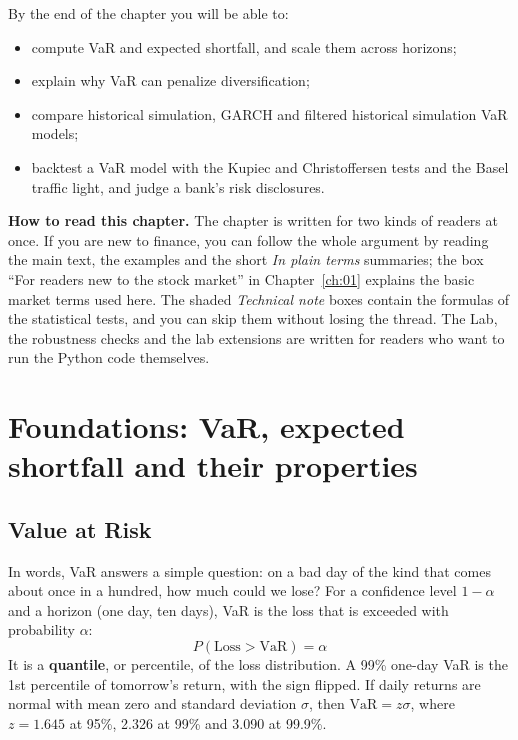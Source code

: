 By the end of the chapter you will be able to:

\begin{itemize}[nosep]
  \item compute VaR and expected shortfall, and scale them across horizons;
  \item explain why VaR can penalize diversification;
  \item compare historical simulation, GARCH and filtered historical simulation VaR models;
  \item backtest a VaR model with the Kupiec and Christoffersen tests and the Basel traffic light, and judge a bank's risk disclosures.
\end{itemize}

\begin{callout}
\textbf{How to read this chapter.} The chapter is written for two kinds of readers at once. If you are new to finance, you can follow the whole argument by reading the main text, the examples and the short \emph{In plain terms} summaries; the box ``For readers new to the stock market'' in Chapter~\ref{ch:01} explains the basic market terms used here. The shaded \emph{Technical note} boxes contain the formulas of the statistical tests, and you can skip them without losing the thread. The Lab, the robustness checks and the lab extensions are written for readers who want to run the Python code themselves.
\end{callout}

\section{Foundations: VaR, expected shortfall and their properties}
\label{sec:11-foundations}

\subsection{Value at Risk}

In words, VaR answers a simple question: on a bad day of the kind that comes about once in a hundred, how much could we lose? For a confidence level $1 - \alpha$ and a horizon (one day, ten days), VaR is the loss that is exceeded with probability $\alpha$:
\begin{equation}
  P(\text{Loss} > \mathrm{VaR}) = \alpha
  \label{eq:11-var}
\end{equation}
It is a \textbf{quantile}, or percentile, of the loss distribution. A 99\% one-day VaR is the 1st percentile of tomorrow's return, with the sign flipped. If daily returns are normal with mean zero and standard deviation $\sigma$, then $\mathrm{VaR} = z\sigma$, where $z = 1.645$ at 95\%, 2.326 at 99\% and 3.090 at 99.9\%.

